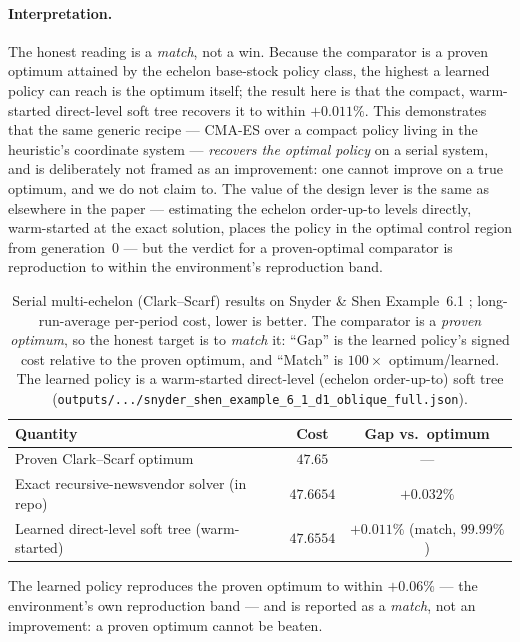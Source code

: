 \paragraph{Interpretation.}
The honest reading is a \emph{match}, not a win. Because the comparator is a proven optimum attained by
the echelon base-stock policy class, the highest a learned policy can reach is the optimum itself; the
result here is that the compact, warm-started direct-level soft tree recovers it to within
$+0.011\%$. This demonstrates that the same generic recipe --- CMA-ES over a compact policy living in
the heuristic's coordinate system --- \emph{recovers the optimal policy} on a serial system, and is
deliberately not framed as an improvement: one cannot improve on a true optimum, and we do not claim
to. The value of the design lever is the same as elsewhere in the paper --- estimating the echelon
order-up-to levels directly, warm-started at the exact solution, places the policy in the optimal
control region from generation~$0$ --- but the verdict for a proven-optimal comparator is reproduction
to within the environment's reproduction band.

\begin{table}[!htbp]
\centering
\caption{Serial multi-echelon (Clark--Scarf) results on Snyder \& Shen Example~6.1
\citep{snyder2019foundations}; long-run-average per-period cost, lower is better. The comparator is a
\emph{proven optimum}, so the honest target is to \emph{match} it: ``Gap'' is the learned policy's
signed cost relative to the proven optimum, and ``Match'' is $100\times$ optimum/learned. The learned
policy is a warm-started direct-level (echelon order-up-to) soft tree
(\texttt{outputs/.../snyder\_shen\_example\_6\_1\_d1\_oblique\_full.json}).}
\label{tab:serial-results}
\begin{tabular}{lcc}
\toprule
Quantity & Cost & Gap vs.\ optimum \\
\midrule
Proven Clark--Scarf optimum \citep{snyder2019foundations} & $47.65$ & --- \\
Exact recursive-newsvendor solver (in repo) & $47.6654$ & $+0.032\%$ \\
Learned direct-level soft tree (warm-started) & $47.6554$ & $+0.011\%$ (match, $99.99\%$) \\
\bottomrule
\end{tabular}
\par\medskip\footnotesize The learned policy reproduces the proven optimum to within $+0.06\%$ --- the
environment's own reproduction band --- and is reported as a \emph{match}, not an improvement: a proven
optimum cannot be beaten.
\end{table}
\FloatBarrier
